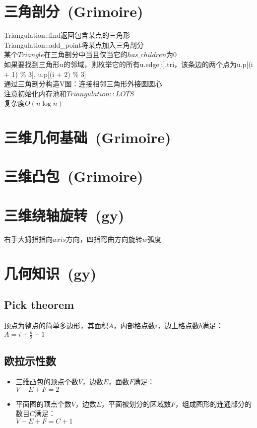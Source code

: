\section{三角剖分\ \small(Grimoire)}
    \noindent Triangulation::find返回包含某点的三角形
    \\Triangulation::add\_point将某点加入三角剖分
    \\某个$ Triangle $在三角剖分中当且仅当它的$ has\_children $为$ 0 $
    \\如果要找到三角形u的邻域，则枚举它的所有u.edge[i].tri，该条边的两个点为u.p[(i + 1) \% 3], u.p[(i + 2) \% 3]
    \\通过三角剖分构造V图：连接相邻三角形外接圆圆心
    \\注意初始化内存池和$ Triangulation::LOTS $
    \\复杂度$ O(n \log n) $
\section{三维几何基础\ \small(Grimoire)}
\section{三维凸包\ \small(Grimoire)}
\section{三维绕轴旋转\ \small(gy)}
    右手大拇指指向$ axis $方向，四指弯曲方向旋转$ w $弧度
\section{几何知识\ \small(gy)}
    \subsection*{Pick theorem}
        顶点为整点的简单多边形，其面积$ A $，内部格点数$ i $，边上格点数$ b $满足：
        \\$ A = i + \frac{b}{2} - 1 $
    \subsection*{欧拉示性数}
        \begin{itemize}[wide=0pt]
            \item 三维凸包的顶点个数$ V $，边数$ E $，面数$ F $满足：
            \\$ V - E + F = 2 $
            \item 平面图的顶点个数$ V $，边数$ E $，平面被划分的区域数$ F $，组成图形的连通部分的数目$ C $满足：
            \\$ V - E + F = C + 1 $
        \end{itemize}

